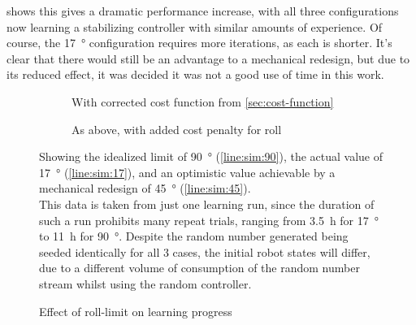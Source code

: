 \documentclass[main.tex]{subfiles}
\begin{document}
	 shows this gives a dramatic performance increase, with all three configurations now learning a stabilizing controller with similar amounts of experience.
	Of course, the \SI{17}{\degree} configuration requires more iterations, as each is shorter.
	It's clear that there would still be an advantage to a mechanical redesign, but due to its reduced effect, it was decided it was not a good use of time in this work.

	\begin{figure}
		\begin{subfigure}[t]{\linewidth}
			\begin{minipage}{0.5\linewidth - 2em}
				
			\end{minipage}\hfill
			\begin{minipage}{0.5\linewidth - 2em}
				
			\end{minipage}
			\caption{With corrected cost function from \cref{sec:cost-function}}
			\label{fig:roll:progress:prev}
		\end{subfigure}
		\par\bigskip
		\begin{subfigure}[t]{\linewidth}
			\begin{minipage}{0.5\linewidth - 2em}
				
			\end{minipage}\hfill
			\begin{minipage}{0.5\linewidth - 2em}
				
			\end{minipage}
			\caption{As above, with added cost penalty for roll}
			\label{fig:roll:progress:fixed}
		\end{subfigure}
		\caption{Effect of roll-limit on learning progress}
		\label{fig:roll:progress}
		\medskip
		\small
		Showing the idealized limit of \SI{90}{\degree} (\ref{line:sim:90}), the actual value of \SI{17}{\degree} (\ref{line:sim:17}), and an optimistic value achievable by a mechanical redesign of \SI{45}{\degree} (\ref{line:sim:45}).
		\medskip\\
		This data is taken from just one learning run, since the duration of such a run prohibits many repeat trials, ranging from \SI{3.5}{\hour} for \SI{17}{\degree} to \SI{11}{\hour} for \SI{90}{\degree}.
		Despite the random number generated being seeded identically for all 3 cases, the initial robot states will differ, due to a different volume of consumption of the random number stream whilst using the random controller.
	\end{figure}

	\bib
\end{document}
